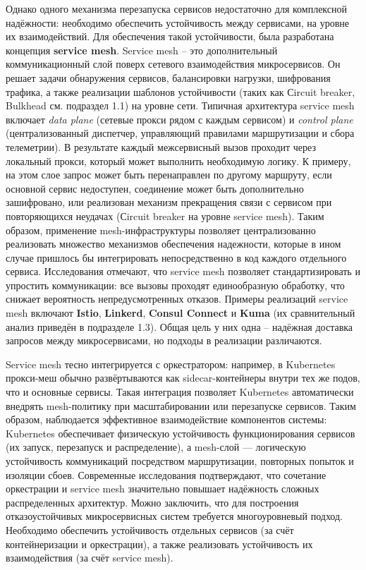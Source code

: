 Однако одного механизма перезапуска сервисов недостаточно для комплексной надёжности: необходимо обеспечить устойчивость между сервисами, на уровне их взаимодействий. Для обеспечения такой устойчивости, была разработана концепция \textbf{service mesh}. Service mesh – это дополнительный коммуникационный слой поверх сетевого взаимодействия микросервисов. Он решает задачи обнаружения сервисов, балансировки нагрузки, шифрования трафика, а также реализации шаблонов устойчивости (таких как Сircuit breaker, Bulkhead см. подраздел 1.1) на уровне сети. Типичная архитектура service mesh включает \textit{data plane} (сетевые прокси рядом с каждым сервисом) и \textit{control plane} (централизованный диспетчер, управляющий правилами маршрутизации и сбора телеметрии). В результате каждый межсервисный вызов проходит через локальный прокси, который может выполнить необходимую логику. К примеру, на этом слое запрос может быть перенаправлен по другому маршруту, если основной сервис недоступен, соединение может быть дополнительно зашифровано, или реализован механизм прекращения связи с сервисом при повторяющихся неудачах (Сircuit breaker на уровне service mesh). Таким образом, применение mesh-инфраструктуры позволяет централизованно реализовать множество механизмов обеспечения надежности, которые в ином случае пришлось бы интегрировать непосредственно в код каждого отдельного сервиса. Исследования отмечают, что service mesh позволяет стандартизировать и упростить коммуникации: все вызовы проходят единообразную обработку, что снижает вероятность непредусмотренных отказов\cite{palavesam2025}. Примеры реализаций service mesh включают \textbf{Istio}, \textbf{Linkerd}, \textbf{Consul Connect} и \textbf{Kuma} (их сравнительный анализ приведён в подразделе 1.3). Общая цель у них одна – надёжная доставка запросов между микросервисами\cite{farkiani2022}, но подходы в реализации различаются.

Service mesh тесно интегрируется с оркестратором: например, в Kubernetes прокси-меш обычно развёртываются как sidecar-контейнеры внутри тех же подов, что и основные сервисы. Такая интеграция позволяет Kubernetes автоматически внедрять mesh-политику при масштабировании или перезапуске сервисов. Таким образом, наблюдается эффективное взаимодействие компонентов системы: Kubernetes обеспечивает физическую устойчивость функционирования сервисов (их запуск, перезапуск и распределение), а mesh-слой — логическую устойчивость коммуникаций посредством маршрутизации, повторных попыток и изоляции сбоев. Современные исследования подтверждают, что сочетание оркестрации и service mesh значительно повышает надёжность сложных распределенных архитектур\cite{palavesam2025}. Можно заключить, что для построения отказоустойчивых микросервисных систем требуется многоуровневый подход. Необходимо обеспечить устойчивость отдельных сервисов (за счёт контейнеризации и оркестрации), а также реализовать устойчивость их взаимодействия (за счёт service mesh).



